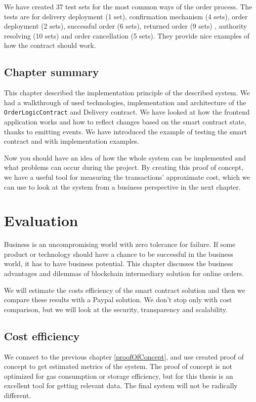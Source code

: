 \documentclass[thesis=M,english]{FITthesis}[2019/12/23]
\begin{document}
We have created 37 test sets for the most common ways of the order process. The tests are for delivery deployment (1 set), confirmation mechanism (4 sets), order deployment (2 sets), successful order (6 sets), returned order (9 sets) , authority resolving (10 sets) and order cancellation (5 sets). They provide nice examples of how the contract should work.

\section{Chapter summary}
This chapter described the implementation principle of the described system. We had a walkthrough of used technologies, implementation and architecture of the \texttt{OrderLogicContract} and Delivery contract. We have looked at how the frontend application works and how to reflect changes based on the smart contract state, thanks to emitting events. We have introduced the example of testing the smart contract and with implementation examples.

Now you should have an idea of how the whole system can be implemented and what problems can occur during the project. By creating this proof of concept, we have a useful tool for measuring the transactions' approximate cost, which we can use to look at the system from a business perspective in the next chapter.


\chapter{Evaluation}
Business is an uncompromising world with zero tolerance for failure. If some product or technology should have a chance to be successful in the business world, it has to have business potential. This chapter discusses the business advantages and dilemmas of blockchain intermediary solution for online orders. 

We will estimate the costs efficiency of the smart contract solution and then we compare these results with a Paypal solution. We don't stop only with cost comparison, but we will look at the security, transparency and scalability. 

\section{Cost efficiency}


We connect to the previous chapter \ref{proofOfConcept}, and use created proof of concept to get estimated metrics of the system. The proof of concept is not optimized for gas consumption or storage efficiency, but for this thesis is an excellent tool for getting relevant data. The final system will not be radically different.
\end{document}
